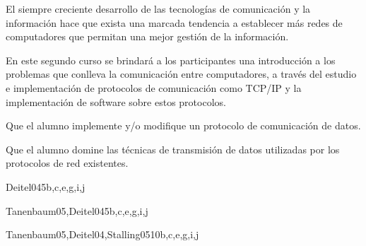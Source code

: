 \begin{syllabus}


\begin{justification}
El siempre creciente desarrollo de las tecnologías de comunicación y la
información hace que exista una marcada tendencia a  establecer
más redes de computadores que permitan una mejor
gestión de la información.

En este segundo curso se brindará a los participantes una introducción a los
problemas que conlleva la comunicación entre computadores, a través del
estudio e implementación de protocolos de comunicación como TCP/IP y
la implementación de software sobre estos protocolos.
\end{justification}

\begin{goals}
\item Que el alumno implemente y/o modifique un protocolo de comunicación de datos.
\item Que el alumno domine las técnicas de transmisión de datos utilizadas por los protocolos de red existentes.
\end{goals}

\begin{outcomes}
\end{outcomes}

\begin{unit}{\PFEventDrivenProgrammingDef}{Deitel04}{5}{b,c,e,g,i,j}
   \PFEventDrivenProgrammingAllTopics
   \begin{learningoutcomes}
      \item \PFEventDrivenProgrammingObjTWO
      \item \PFEventDrivenProgrammingObjTHREE
   \end{learningoutcomes}
\end{unit}

\begin{unit}{\NCNetworkSecurityDef}{Tanenbaum05,Deitel04}{5}{b,c,e,g,i,j}
        \NCNetworkSecurityAllTopics
        \NCNetworkSecurityAllObjectives
\end{unit}

\begin{unit}{\NCWebOrganizationDef}{Tanenbaum05,Deitel04,Stalling05}{10}{b,c,e,g,i,j}
        \NCWebOrganizationAllTopics
        \NCWebOrganizationAllObjectives
\end{unit}


\end{syllabus}
